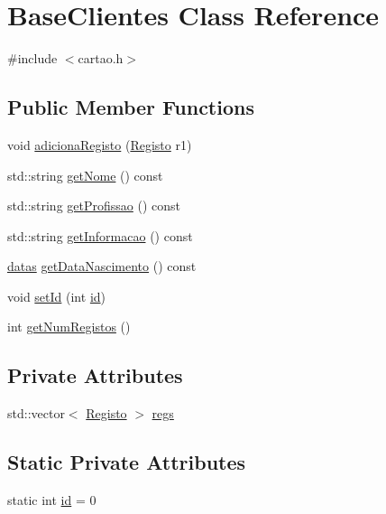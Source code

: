 \hypertarget{class_base_clientes}{}\section{Base\+Clientes Class Reference}
\label{class_base_clientes}


{\ttfamily \#include $<$cartao.\+h$>$}

\subsection*{Public Member Functions}
\begin{DoxyCompactItemize}
\item 
void \mbox{\hyperlink{class_base_clientes_ad9f54e6c07cd4df57125dce94881b754}{adiciona\+Registo}} (\mbox{\hyperlink{class_registo}{Registo}} r1)
\item 
std\+::string \mbox{\hyperlink{class_base_clientes_a15d398aef3b426df9f0a76602ebfc1bc}{get\+Nome}} () const
\item 
std\+::string \mbox{\hyperlink{class_base_clientes_a48f26cf2050fb9081cb3e3af649b2a69}{get\+Profissao}} () const
\item 
std\+::string \mbox{\hyperlink{class_base_clientes_a26bfebe87514243d8f7d54296202ea83}{get\+Informacao}} () const
\item 
\mbox{\hyperlink{structdatas}{datas}} \mbox{\hyperlink{class_base_clientes_af5f1851e06f265c81ea5e8972dd3fc29}{get\+Data\+Nascimento}} () const
\item 
void \mbox{\hyperlink{class_base_clientes_addf94bea5b7b66371ff58f34c0655fd7}{set\+Id}} (int \mbox{\hyperlink{class_base_clientes_ab33dc8c88fd409fb2c6405e4487397f5}{id}})
\item 
int \mbox{\hyperlink{class_base_clientes_a890a2929f2f11f7ba7a1d412e1754747}{get\+Num\+Registos}} ()
\end{DoxyCompactItemize}
\subsection*{Private Attributes}
\begin{DoxyCompactItemize}
\item 
std\+::vector$<$ \mbox{\hyperlink{class_registo}{Registo}} $>$ \mbox{\hyperlink{class_base_clientes_a8a4ee86b51d7dbd180738619163879fe}{regs}}
\end{DoxyCompactItemize}
\subsection*{Static Private Attributes}
\begin{DoxyCompactItemize}
\item 
static int \mbox{\hyperlink{class_base_clientes_ab33dc8c88fd409fb2c6405e4487397f5}{id}} = 0
\end{DoxyCompactItemize}


